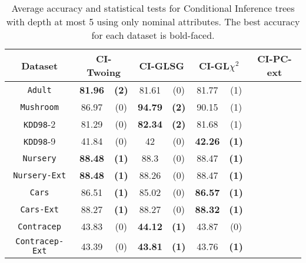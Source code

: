 \begin{table*}
\small
\centering
    \caption{Average accuracy and statistical tests  for  Conditional Inference trees 
with depth at most 5 using only nominal attributes. The best accuracy for each dataset is bold-faced.}
\label{tab:CrossValCTree}
\begin{tabular}{c|cc|cc|cc|cc} 
Dataset  &   \multicolumn{2}{c|}{CI-Twoing} &   \multicolumn{2}{c|}{CI-GLSG} & \multicolumn{2}{c|}{CI-GL$\chi^2$}& \multicolumn{2}{c}{CI-PC-ext} \\  \hline   
{\tt Adult}        &{\bf 81.96} &{\bf  (2)} & 81.61       & (0)       & 81.77       & (1)       &             &           \\
{\tt Mushroom}     &86.97       & (0)       &{\bf  94.79 }& {\bf (2)} & 90.15       & (1)       &             &           \\
{\tt KDD98}-2      &81.29       & (0)       & {\bf 82.34 }& {\bf (2) }& 81.68       & (1)       &             &           \\
{\tt KDD98}-9      &41.84       & (0)       & 42          & (0)       & {\bf 42.26} & {\bf (1)} &             &           \\
{\tt Nursery}      &{\bf 88.48} & {\bf (1)} & 88.3        & (0)       & 88.47       & {\bf (1)} &             &           \\
{\tt Nursery-Ext}  &{\bf 88.48} & {\bf (1)} & 88.26       & (0)       & 88.47       & {\bf (1)} &             &           \\
{\tt Cars}         &86.51       & {\bf (1)} & 85.02       & (0)       & {\bf 86.57} & {\bf (1)} &             &           \\
{\tt Cars-Ext}     &88.27       & {\bf (1) }& 88.27       & (0)       & {\bf 88.32} & {\bf (1)} &             &           \\
{\tt Contracep}    &43.83       & (0)       & {\bf 44.12} & {\bf (1)} & 43.87       & (0)       &             &           \\
{\tt Contracep-Ext}&43.39       & (0)       & {\bf 43.81} & {\bf (1)} & 43.76       & {\bf (1)} &             &           \\

\end{tabular}
\end{table*}
